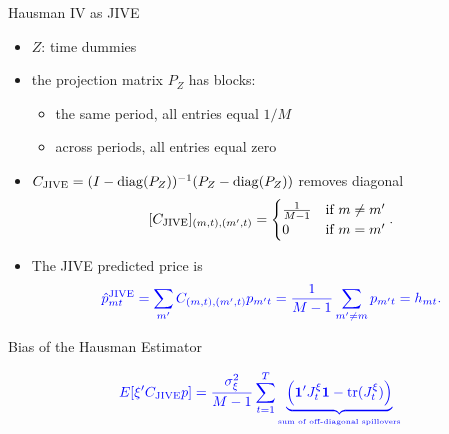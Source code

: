 \documentclass[notes,11pt, aspectratio=169]{beamer}
\DeclareMathOperator{\tr}{tr}
\DeclareMathOperator{\diag}{diag}
\begin{document}
\begin{frame}{Hausman IV as JIVE}

\begin{itemize}
    \item $Z$: time dummies
    
    \item the projection matrix $P_Z$ has blocks:
    \begin{itemize}
        \item the same period, all entries equal $1/M$ 
        \item across periods, all entries equal zero
    \end{itemize}

\item $C_{\textup{JIVE}} = (I - \diag(P_Z))^{-1}(P_Z - \diag(P_Z))$ removes diagonal 
\begin{equation} \nonumber
    [C_{\textup{JIVE}}]_{(m,t),(m',t)} = \begin{cases}
        \frac{1}{M-1} & \text{if } m \neq m' \\
        0 & \text{if } m = m'
    \end{cases}.
\end{equation}

\item The JIVE predicted price is
\begin{equation} \nonumber
    \textcolor{blue}{\hat{p}_{mt}^{\text{JIVE}} = \sum_{m'} C_{(m,t),(m',t)} p_{m't} = \frac{1}{M-1} \sum_{m' \neq m} p_{m't} = h_{mt}.}
\end{equation}
\end{itemize}
    
\end{frame}


\begin{frame}{Bias of the Hausman Estimator}

\begin{equation}
  \textcolor{blue}{  E[\xi' C_{\textup{JIVE}} p] = \frac{\sigma_\xi^2}{M-1} \sum_{t=1}^T \underbrace{\left( \mathbf{1}' J_t^\xi \mathbf{1} - \tr(J_t^\xi) \right)}_{\text{\tiny sum of off-diagonal spillovers}}} \nonumber
\end{equation}    
\end{frame}
\end{document}
